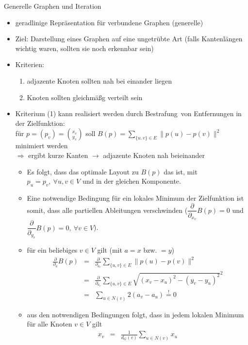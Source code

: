 \begin{TOP}{Generelle Graphen und Iteration}
\vspace*{-1.5\baselineskip}
\begin{itemize}[itemsep=-1pt]
	\item geradlinige Repräsentation für verbundene Graphen (generelle)
	\item Ziel: Darstellung eines Graphen auf eine ungetrübte Art (falls Kantenlängen wichtig waren, sollten sie noch erkennbar sein)
	\item Kriterien:
		\begin{enumerate}[itemsep=-1pt]
			\item adjazente Knoten sollten nah bei einander liegen
			\item Knoten sollten gleichmäßg verteilt sein
		\end{enumerate}
	\item Kriterium (1) kann realisiert werden durch \glqq Bestrafung\grqq~von Entfernungen in der Zielfunktion:\\
		für $p=(p_v)={x_v\choose y_v}$ soll $B(p)=\sum\limits_{\{u,v\}\in E}\|p(u)-p(v)\|^2$ minimiert werden\\
		$\Rightarrow $ ergibt kurze Kanten $\rightarrow$ adjazente Knoten nah beieinander
		\begin{itemize}
			\item Es folgt, dass das optimale Layout zu $B(p)$ das ist, mit $p_u=p_v,~\forall u,v\in V$ und in der gleichen Komponente.
			\item Eine notwendige Bedingung für ein lokales Minimum der Zielfunktion ist somit, dass alle partiellen Ableitungen verschwinden ($\dfrac{\partial}{\partial_{x_v}} B(p)=0$ und $\dfrac{\partial}{\partial_{y_v}} B(p)=0,~\forall v\in V$).
			\item für ein beliebiges $v\in V$ gilt (mit $a=x$ bzw. $=y$)
				\begin{eqnarray*}
					\frac{\partial}{\partial_{a}} B(p)&=&\frac{\partial}{\partial_{a_v}}\sum\limits_{\{u,v\}\in E}\|p(u)-p(v)\|^2\\
					&=&\frac{\partial}{\partial_{a_v}}\sum\limits_{\{u,v\}\in E}\sqrt{(x_v-x_u)^2-(y_v-y_u)^2}^2\\
					&=&\sum\limits_{u\in N(v)}2(a_v-a_u)\overset{!}{=}0
				\end{eqnarray*}
			\item aus den notwendigen Bedingungen folgt, dass in jedem lokalen Minimum für alle Knoten $v\in V$ gilt
				\begin{eqnarray*}
					x_v&=&\frac{1}{d_G(v)}\sum\limits_{u\in N(v)}x_u\\

\end{eqnarray*}
\end{itemize}
\end{itemize}
\end{TOP}
